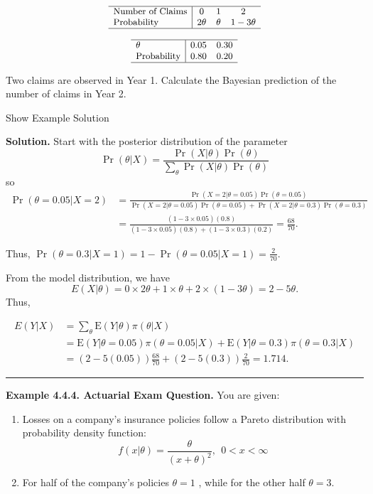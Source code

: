 \documentclass[]{book}
\providecommand{\tightlist}{%
  \setlength{\itemsep}{0pt}\setlength{\parskip}{0pt}}
\theoremstyle{definition}
\theoremstyle{definition}
\theoremstyle{definition}
\theoremstyle{remark}
\begin{document}
\[
{\small
\begin{array}{l|ccc}
\hline
\text{Number of Claims} & 0 & 1 & 2 \\
\text{Probability} & 2\theta & \theta & 1-3\theta \\
\hline
\end{array}
}
\]

\[
{\small
\begin{array}{l|cc}
\hline
\theta & 0.05 & 0.30 \\
\text{Probability} & 0.80 & 0.20 \\
\hline
\end{array}
}
\]

Two claims are observed in Year 1. Calculate the Bayesian prediction of
the number of claims in Year 2.

Show Example Solution

\hypertarget{toggleExampleSelect.4.3}{}
\textbf{Solution.} Start with the posterior distribution of the
parameter \[
\Pr(\theta|X) = \frac{\Pr(X|\theta)\Pr(\theta)}{\sum_{\theta}\Pr(X|\theta)\Pr(\theta)}
\] so \[
\begin{aligned} 
\Pr(\theta=0.05|X=2) &= \frac{\Pr(X=2|\theta=0.05)\Pr(\theta=0.05)}
{\Pr(X=2|\theta=0.05)\Pr(\theta=0.05)+\Pr(X=2|\theta=0.3)\Pr(\theta=0.3)}\\
&=\frac{(1-3\times 0.05)(0.8)}{(1-3\times 0.05)(0.8)+(1-3\times 0.3)(0.2)}= \frac{68}{70}.
\end{aligned} 
\]

Thus, \(\Pr(\theta=0.3|X=1)= 1 - \Pr(\theta=0.05|X=1) = \frac{2}{70}\).

From the model distribution, we have \[
E(X|\theta) = 0 \times 2\theta + 1 \times \theta + 2 \times (1-3\theta) = 2 - 5 \theta.
\] Thus,

\[
\begin{aligned}
E(Y|X)
&=   \sum_{\theta}  \mathrm{E}(Y|\theta) \pi(\theta|X) \\
&= \mathrm{E}(Y|\theta=0.05) \pi(\theta=0.05|X)+\mathrm{E}(Y|\theta=0.3) \pi(\theta=0.3|X)\\
&= ( 2 - 5 (0.05))\frac{68}{70} + ( 2 - 5 (0.3))\frac{2}{70} = 1.714.
\end{aligned}
\]

\begin{center}\rule{0.5\linewidth}{\linethickness}\end{center}

\textbf{Example 4.4.4. Actuarial Exam Question.} You are given:

\begin{enumerate}
\def\labelenumi{(\roman{enumi})}
\tightlist
\item
  Losses on a company's insurance policies follow a Pareto distribution
  with probability density function: \[
  f(x|\theta) = \frac{\theta}{(x+\theta)^2}, \ \ 0 < x < \infty
  \]
\item
  For half of the company's policies \(\theta=1\) , while for the other
  half \(\theta=3\).
\end{enumerate}
\end{document}
